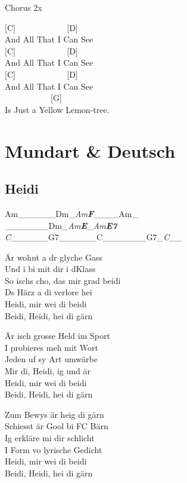 \documentclass[
  letterpaper,
]{scrbook}
\begin{document}
Chorus 2x

{[}C{]} ~ ~ ~ ~ ~ ~ ~ {[}D{]}\\
And All That I Can See\\
{[}C{]} ~ ~ ~ ~ ~ ~ ~ {[}D{]}\\
And All That I Can See\\
{[}C{]} ~ ~ ~ ~ ~ ~ ~ {[}D{]}\\
And All That I Can See\\
\hspace*{0.333em} ~ ~ ~ ~ ~ ~ ~{[}G{]}\\
Is Just a Yellow Lemon-tree.

\part{Mundart \& Deutsch}

\hypertarget{heidi}{%
\chapter{Heidi}\label{heidi}}

\textbar Am\_\_\_\_\_\_\textbar Dm\_\emph{Am\textbf{\textbar{}F}}\textbar\_\_\_\_Am\_\emph{\textbar{}\\
\textbar{}}\_\_\_\_\_\_\_\textbar Dm\_\emph{Am\textbf{\textbar E}\_Am\textbf{\textbar{}E7}\textbar{}\\
\textbar C}\_\_\_\_\_\_\textbar G7\_\_\_\_\_\_\textbar C\_\_\_\_\_\_\_\textbar G7\_\emph{C}\_\_\textbar{}

Är wohnt a dr glyche Gass\\
Und i bi mit dir i d\textquotesingle Klass\\
So ischs cho, das mir grad beidi\\
Ds Härz a di verlore hei\\
Heidi, mir wei di beidi\\
Beidi, Heidi, hei di gärn

Är isch grosse Held im Sport\\
I probieres meh mit Wort\\
Jeden uf sy Art umwärbe\\
Mir di, Heidi, ig und är\\
Heidi, mir wei di beidi\\
Beidi, Heidi, hei di gärn

Zum Bewys är heig di gärn\\
Schiesst är Gool bi FC Bärn\\
Ig erkläre mi dir schlicht\\
I Form vo lyrische Gedicht\\
Heidi, mir wei di beidi\\
Beidi, Heidi, hei di gärn
\end{document}
